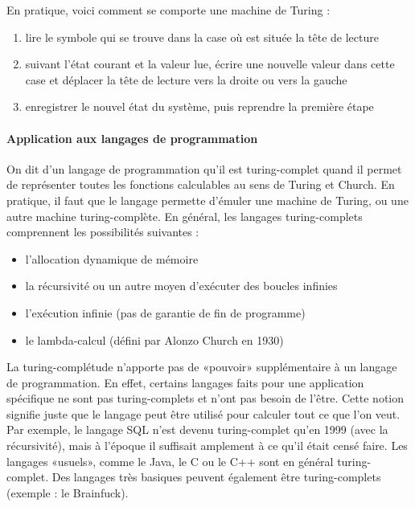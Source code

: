 En pratique, voici comment se comporte une machine de Turing \cite{bib_wiki_turing} \cite{bib_jdn} :
\begin{enumerate}
\item lire le symbole qui se trouve dans la case où est située la tête de lecture
\item suivant l'état courant et la valeur lue, écrire une nouvelle valeur dans cette case et déplacer la tête de lecture vers la droite ou vers la gauche
\item enregistrer le nouvel état du système, puis reprendre la première étape
\end{enumerate}

\paragraph{Application aux langages de programmation}

On dit d'un langage de programmation qu'il est turing-complet quand il permet de représenter toutes les fonctions calculables au sens de Turing et Church. \cite{bib_w3support} \cite{bib_wiki_lambda} En pratique, il faut que le langage permette d'émuler une machine de Turing, ou une autre machine turing-complète. En général, les langages turing-complets comprennent les possibilités suivantes :
\begin{itemize}
\item l'allocation dynamique de mémoire
\item la récursivité ou un autre moyen d'exécuter des boucles infinies
\item l'exécution infinie (pas de garantie de fin de programme)
\item le lambda-calcul (défini par Alonzo Church en 1930)\\
\end{itemize}

La turing-complétude n'apporte pas de «pouvoir» supplémentaire à un langage de programmation. En effet, certains langages faits pour une application spécifique ne sont pas turing-complets et n'ont pas besoin de l'être. Cette notion signifie juste que le langage peut être utilisé pour calculer tout ce que l'on veut. Par exemple, le langage SQL n'est devenu turing-complet qu'en 1999 (avec la récursivité), mais à l'époque il suffisait amplement à ce qu'il était censé faire. Les langages «usuels», comme le Java, le C ou le C++ sont en général turing-complet. Des langages très basiques peuvent également être turing-complets (exemple : le Brainfuck).\\

